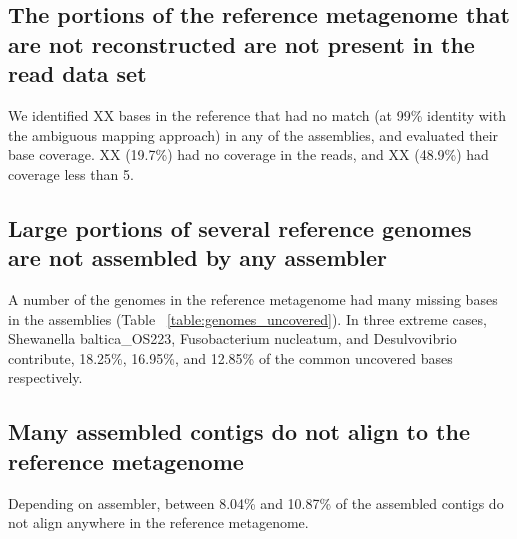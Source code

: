 \documentclass[10pt,a4paper,twocolumn]{article}
\begin{document}

\subsection*{The portions of the reference metagenome that are not reconstructed are not present in the read data set}
 
We identified XX bases in the reference that had no match (at 99\%
identity with the ambiguous mapping approach) in any of the
assemblies, and evaluated their base coverage. XX (19.7\%) had no coverage
in the reads, and XX (48.9\%) had coverage less than 5.


\subsection*{Large portions of several reference genomes are not assembled by any assembler}

A number of the genomes in the reference metagenome had many missing
bases in the assemblies (Table ~\ref{table:genomes_uncovered}). In
three extreme cases, Shewanella baltica\_OS223, Fusobacterium
nucleatum, and Desulvovibrio contribute, 18.25\%, 16.95\%, and 12.85\%
of the common uncovered bases respectively.



\subsection*{Many assembled contigs do not align to the reference metagenome}
Depending on assembler, between 8.04\% and 10.87\% of the assembled
contigs do not align anywhere in the reference metagenome.
\end{document}
